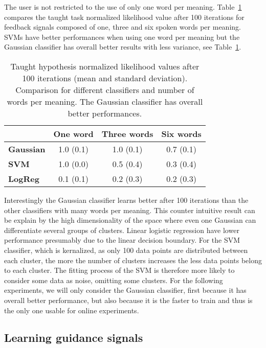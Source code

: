 The user is not restricted to the use of only one word per meaning. Table~\ref{tab:1} compares the taught task normalized likelihood value after 100 iterations for feedback signals composed of one, three and six spoken words per meaning. SVMs have better performances when using one word per meaning but the Gaussian classifier has overall better results with less variance, see Table~\ref{tab:1}.

\begin{table}[!htbp]
\centering
\begin{tabular}{|l|c|c|c|}
\hline
&\textbf{One word}&\textbf{Three words}&\textbf{Six words}\\\hline
\textbf{Gaussian}&1.0 (0.1)&1.0 (0.1)&0.7 (0.1)\\\hline
\textbf{SVM}&1.0 (0.0)&0.5 (0.4)&0.3 (0.4)\\\hline
\textbf{LogReg}&0.1 (0.1)&0.2 (0.3)&0.2 (0.3)\\\hline
\end{tabular}
\caption{Taught hypothesis normalized likelihood values after 100 iterations (mean and standard deviation). Comparison for different classifiers and number of words per meaning. The Gaussian classifier has overall better performances.}
\label{tab:1}
\end{table}

Interestingly the Gaussian classifier learns better after 100 iterations than the other classifiers with many words per meaning. This counter intuitive result can be explain by the high dimensionality of the space where even one Gaussian can differentiate several groups of clusters. Linear logistic regression have lower performance presumably due to the linear decision boundary. For the SVM classifier, which is kernalized, as only 100 data points are distributed between each cluster, the more the number of clusters increases the less data points belong to each cluster. The fitting process of the SVM is therefore more likely to consider some data as noise, omitting some clusters. For the following experiments, we will only consider the Gaussian classifier, first because it has overall better performance, but also because it is the faster to train and thus is the only one usable for online experiments. 


\subsection{Learning guidance signals}

